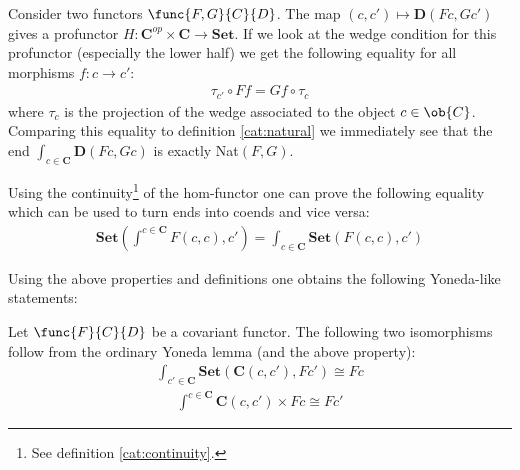 	\begin{example}
		Consider two functors $\func{F, G}{C}{D}$. The map $(c, c')\mapsto\mathbf{D}(Fc, Gc')$ gives a profunctor $H:\mathbf{C}^{op}\times\mathbf{C}\rightarrow\mathbf{Set}$. If we look at the wedge condition for this profunctor (especially the lower half) we get the following equality for all morphisms $f:c\rightarrow c'$:
		\begin{gather}
			\tau_{c'}\circ Ff = Gf\circ \tau_c
		\end{gather}
		where $\tau_c$ is the projection of the wedge associated to the object $c\in\ob{C}$. Comparing this equality to definition \ref{cat:natural} we immediately see that the end $\int_{c\in\mathbf{C}}\mathbf{D}(Fc, Gc)$ is exactly Nat$(F, G)$.
	\end{example}
	
	\begin{property}
		Using the continuity\footnote{See definition \ref{cat:continuity}.} of the hom-functor one can prove the following equality which can be used to turn ends into coends and vice versa:
		\begin{gather}
			\mathbf{Set}\left(\int^{c\in\mathbf{C}}F(c, c), c'\right) = \int_{c\in\mathbf{C}}\mathbf{Set}\left(F(c, c), c'\right)
		\end{gather}
	\end{property}
	
	Using the above properties and definitions one obtains the following Yoneda-like statements:
	\begin{theorem}
		Let $\func{F}{C}{D}$ be a covariant functor. The following two isomorphisms follow from the ordinary Yoneda lemma (and the above property):
		\begin{gather}
			\int_{c'\in\mathbf{C}}\mathbf{Set}\left(\mathbf{C}(c, c'), Fc'\right)\cong Fc
		\end{gather}
		\begin{gather}
			\int^{c\in\mathbf{C}}\mathbf{C}(c, c')\times Fc\cong Fc'
		\end{gather}
	\end{theorem}
	
